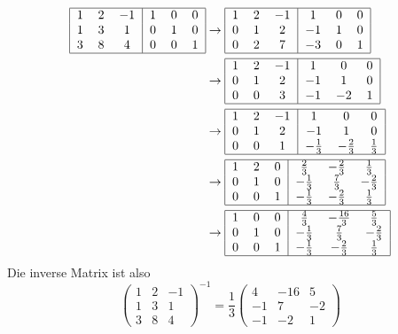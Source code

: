 {\begin{loesung}
\begin{teilaufgaben}
\item
\begin{align*}
\begin{tabular}{|ccc|ccc|}
\hline
1&2&$-1$&1&0&0\\
1&3&1&0&1&0\\
3&8&4&0&0&1\\
\hline
\end{tabular}
&
\rightarrow
\begin{tabular}{|ccc|ccc|}
\hline
1&2&$-1$&1&0&0\\
0&1&2&$-1$&1&0\\
0&2&7&$-3$&0&1\\
\hline
\end{tabular}
\\
&\rightarrow
\begin{tabular}{|ccc|ccc|}
\hline
1&2&$-1$&1&0&0\\
0&1&2&$-1$&1&0\\
0&0&3&$-1$&$-2$&1\\
\hline
\end{tabular}
\\
&\rightarrow
\begin{tabular}{|ccc|ccc|}
\hline
1&2&$-1$&1&0&0\\
0&1&2&$-1$&1&0\\
0&0&1&$-\frac13$&$-\frac23$&$\frac13$\\
\hline
\end{tabular}
\\
&\rightarrow
\begin{tabular}{|ccc|ccc|}
\hline
1&2&0&$\frac23$&$-\frac23$&$\frac13$\\
0&1&0&$-\frac13$&$\frac73$&$-\frac23$\\
0&0&1&$-\frac13$&$-\frac23$&$\frac13$\\
\hline
\end{tabular}
\\
&\rightarrow
\begin{tabular}{|ccc|ccc|}
\hline
1&0&0&$\frac43$&$-\frac{16}3$&$\frac53$\\
0&1&0&$-\frac13$&$\frac73$&$-\frac23$\\
0&0&1&$-\frac13$&$-\frac23$&$\frac13$\\
\hline
\end{tabular}
\end{align*}
Die inverse Matrix ist also
\[
\begin{pmatrix}
1&2&-1\\
1&3&1\\
3&8&4
\end{pmatrix}^{-1}
=
\frac13
\begin{pmatrix}
4&-16&5\\
-1&7&-2\\
-1&-2&1
\end{pmatrix}
\]

\end{teilaufgaben}
\end{loesung}
}{}

